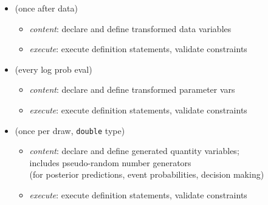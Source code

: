 \documentclass[10pt]{report}
\newcommand{\sld}[1]{\newpage{\noindent\LARGE \ \ \
    \textcolor{MidnightBlue}{\bfseries #1}}\vspace*{4pt}}
\newcommand{\code}[1]{{\tt #1}}
\newcommand{\myemph}[1]{{\color{MidnightBlue}{\bfseries #1}}}
\begin{document}
\begin{itemize}
\item \myemph{\tt\bfseries transformed data} (once after data)
  \vspace*{-4pt}
  \begin{itemize}\small
  \item {\slshape content}: declare and define transformed data variables
  \item {\slshape execute}: execute definition statements, validate constraints
  \end{itemize}
\item \myemph{\tt\bfseries transformed parameters} (every log prob eval)
  \vspace*{-4pt}
  \begin{itemize}\small
  \item {\slshape content}: declare and define transformed parameter vars
  \item {\slshape execute}: execute definition statements, validate constraints
  \end{itemize}
\item \myemph{\tt\bfseries generated quantities} (once per draw, 
  \code{double} type)
  \vspace*{-4pt}
  \begin{itemize}\small
  \item {\slshape content}: declare and define generated quantity
    variables; \\
    includes pseudo-random number generators
    \\
    {\footnotesize (for posterior predictions, event probabilities,
      decision making)}
  \item {\slshape execute}: execute definition statements, validate constraints
  \end{itemize}
\end{itemize}


\sld{User-Defined Functions (Stan 2.3)}
\end{document}
